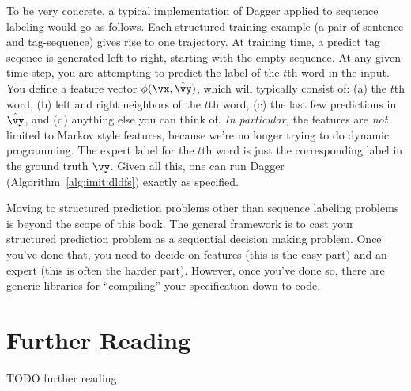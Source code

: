 To be very concrete, a typical implementation of Dagger applied to sequence labeling would go as follows.
Each structured training example (a pair of sentence and tag-sequence) gives rise to one trajectory.
At training time, a predict tag seqence is generated left-to-right, starting with the empty sequence.
At any given time step, you are attempting to predict the label of the $t$th word in the input.
You define a feature vector $\phi(\vx,\hat\vy)$, which will typically consist of: (a) the $t$th word, (b) left and right neighbors of the $t$th word, (c) the last few predictions in $\hat\vy$, and (d) anything else you can think of.
\emph{In particular,} the features are \emph{not} limited to Markov style features, because we're no longer trying to do dynamic programming.
The expert label for the $t$th word is just the corresponding label in the ground truth $\vy$.
Given all this, one can run Dagger (Algorithm~\ref{alg:imit:dldfs}) exactly as specified.

Moving to structured prediction problems other than sequence labeling problems is beyond the scope of this book.
The general framework is to cast your structured prediction problem as a sequential decision making problem.
Once you've done that, you need to decide on features (this is the easy part) and an expert (this is often the harder part).
However, once you've done so, there are generic libraries for ``compiling'' your specification down to code.

\section{Further Reading}

TODO further reading


